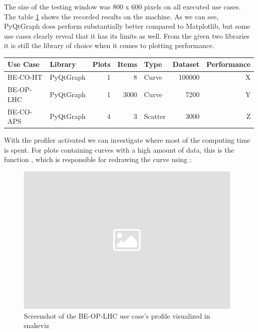The size of the testing window was 800 x 600 pixels on all executed use cases.
The table \ref{tab:application:usecases:results} shows the recorded results on
the machine. As we can see, PyQtGraph does perform substantially better compared
to Matplotlib, but some use cases clearly reveal that it has its limits as well.
From the given two libraries it is still the library of choice when it comes to
plotting performance.

\begin{table}[h]
\begin{center}

\label{tab:application:usecases:results}

\begin{tabular}{llrrlrr}

\hline
Use Case  & Library   & Plots & Items & Type    & Dataset & Performance \\ \hline
BE-CO-HT  & PyQtGraph & 1     & 8     & Curve   & 100000  & X           \\
BE-OP-LHC & PyQtGraph & 1     & 3000  & Curve   & 7200    & Y           \\
BE-CO-APS & PyQtGraph & 4     & 3     & Scatter & 3000    & Z           \\ \hline

\end{tabular}

\end{center}

\end{table}

With the profiler activated we can investigate where most of the computing time
is spent. For plots containing curves with a high amount of data, this is the
function , which is
responsible for redrawing the curve using :


\begin{figure}[h]
    \centering
    \includegraphics[width=11cm]{resources/img/placeholder}
    \caption{
        Screenshot of the BE-OP-LHC use case's profile visualized in snakeviz
    }
    \label{fig:application:lhc:usecase:profile}
\end{figure}


